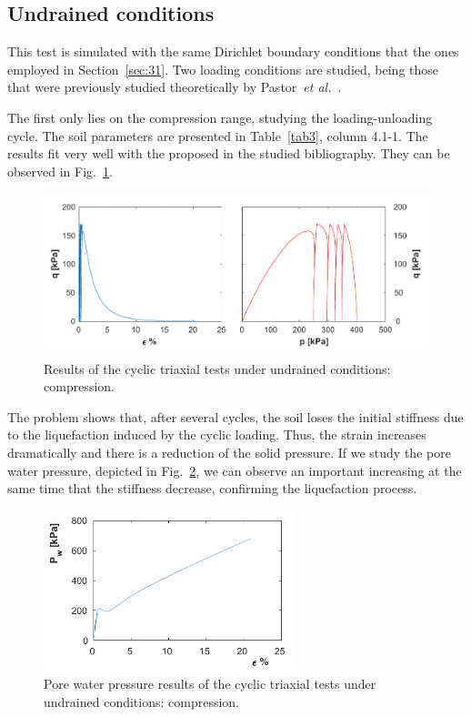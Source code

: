 \documentclass[preprint,12pt,a4paper]{elsarticle}
\begin{document}
\subsection{Undrained conditions}
\label{subsec:41}
This test is simulated with the same Dirichlet boundary conditions that the ones employed in Section~\ref{sec:31}. Two loading conditions are studied, being those that were previously studied theoretically by Pastor~\textit{et al.}~\cite{PastorZC:90}. 

The first only lies on the compression range, studying the loading-unloading cycle. The soil parameters are presented in Table~\ref{tab3}, column 4.1-1. The results fit very well with the proposed in the studied bibliography. They can be observed in Fig.~\ref{fig_c_undrained1}.

\begin{figure}
\centering
\includegraphics[width=1.05\textwidth]{Figs/ciclo_undrained_1.pdf}
\caption{Results of the cyclic triaxial tests under undrained conditions: compression.}
\label{fig_c_undrained1}
\end{figure}

The problem shows that, after several cycles, the soil loses the initial stiffness due to the liquefaction induced by the cyclic loading. Thus, the strain increases dramatically and there is a reduction of the solid pressure. If we study the pore water pressure, depicted in Fig.~\ref{fig_c_undrainedpw}, we can observe an important increasing at the same time that the stiffness decrease, confirming the liquefaction process.

\begin{figure}
\centering
\includegraphics[width=0.65\textwidth]{Figs/ciclo_undrained_pw.pdf}
\caption{Pore water pressure results of the cyclic triaxial tests under undrained conditions: compression.}
\label{fig_c_undrainedpw}
\end{figure}
\end{document}
